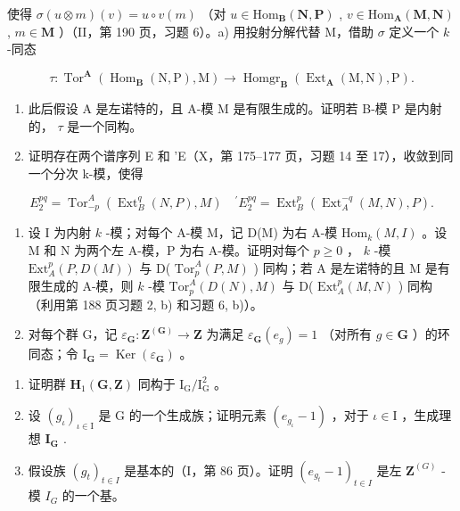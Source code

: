 使得 \(\sigma(u \otimes m)(v) = u \circ v(m)\) （对 \(u \in \mathrm{Hom}_{\mathbf{B}}(\mathbf{N}, \mathbf{P})\) , \(v \in \mathrm{Hom}_{\mathbf{A}}(\mathbf{M}, \mathbf{N})\) , \(m \in \mathbf{M}\) ）（II，第 190 页，习题 6）。a) 用投射分解代替 M，借助 \(\sigma\) 定义一个 \(k\) -同态

\[
\tau : \operatorname{Tor} ^ {\mathbf {A}} \left(\operatorname{Hom} _ {\mathbf {B}} (\mathrm{N}, \mathrm{P}), \mathrm{M}\right)\rightarrow \operatorname{Homgr} _ {\mathbf {B}} \left(\operatorname{Ext} _ {\mathbf {A}} (\mathrm{M}, \mathrm{N}), \mathrm{P}\right).
\]

\begin{enumerate}
\def\labelenumi{\alph{enumi})}
\setcounter{enumi}{1}
\item
  此后假设 A 是左诺特的，且 A-模 M 是有限生成的。证明若 B-模 P 是内射的， \(\tau\) 是一个同构。
\item
  证明存在两个谱序列 E 和 'E（X，第 175–177 页，习题 14 至 17），收敛到同一个分次 k-模，使得
\end{enumerate}

\[
E _ {2} ^ {p q} = \operatorname{Tor} _ {- p} ^ {A} \left(\operatorname{Ext} _ {B} ^ {q} (N, P), M\right) \quad^ {\prime} E _ {2} ^ {p q} = \operatorname{Ext} _ {B} ^ {p} \left(\operatorname{Ext} _ {A} ^ {- q} (M, N), P\right).
\]

\begin{enumerate}
\def\labelenumi{\arabic{enumi})}
\setcounter{enumi}{2}
\item
  设 I 为内射 \(k\) -模；对每个 A-模 M，记 D(M) 为右 A-模 \(\mathrm{Hom}_{k}(M, I)\) 。设 M 和 N 为两个左 A-模，P 为右 A-模。证明对每个 \(p \geqslant 0\) ， \(k\) -模 \(\mathrm{Ext}_{A}^{p}(P, D(M))\) 与 D( \(\mathrm{Tor}_{p}^{A}(P, M)\) ) 同构；若 A 是左诺特的且 M 是有限生成的 A-模，则 \(k\) -模 \(\mathrm{Tor}_{p}^{A}(D(N), M)\) 与 D( \(\mathrm{Ext}_{A}^{p}(M, N)\) ) 同构（利用第 188 页习题 2, b) 和习题 6, b)）。
\item
  对每个群 G，记 \(\varepsilon_{\mathbf{G}}: \mathbf{Z}^{(\mathbf{G})} \to \mathbf{Z}\) 为满足 \(\varepsilon_{\mathbf{G}}(e_g) = 1\) （对所有 \(g \in \mathbf{G}\) ）的环同态；令 \(\mathrm{I}_{\mathbf{G}} = \operatorname{Ker}(\varepsilon_{\mathbf{G}})\) 。
\end{enumerate}

\begin{enumerate}
\def\labelenumi{\alph{enumi})}
\item
  证明群 \(\mathbf{H}_{1}(\mathbf{G},\mathbf{Z})\) 同构于 \(\mathrm{I}_{\mathrm{G}} / \mathrm{I}_{\mathrm{G}}^{2}\) 。
\item
  设 \((g_{\iota})_{\iota \in \mathrm{I}}\) 是 G 的一个生成族；证明元素 \((e_{g_{\iota}} - 1)\) ，对于 \(\iota \in \mathrm{I}\) ，生成理想 \(\mathbf{I}_{\mathbf{G}}\) .
\item
  假设族 \((g_{t})_{t\in I}\) 是基本的（I，第 86 页）。证明 \((e_{g_t} - 1)_{t\in I}\) 是左 \(\mathbf{Z}^{(G)}\) -模 \(I_G\) 的一个基。
\end{enumerate}

